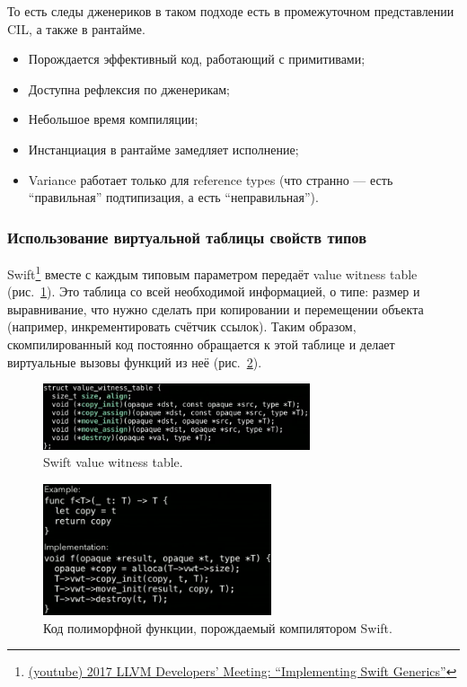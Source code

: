 То есть следы дженериков в таком подходе есть в промежуточном представлении CIL, а также в рантайме.

\begin{itemize}
    \item[\positive] Порождается эффективный код, работающий с примитивами;
    \item[\positive] Доступна рефлексия по дженерикам;
    \item[\positive] Небольшое время компиляции;
    \item[\negative] Инстанциация в рантайме замедляет исполнение;
    \item[\negative] Variance работает только для reference types (что странно --- есть ``правильная'' подтипизация, а есть ``неправильная'').
\end{itemize}


\subsubsection{Использование виртуальной таблицы свойств типов} \label{subsubsec:swift-generics}

Swift\footnote{\href{https://youtu.be/ctS8FzqcRug?si=y_ZYnuUOulA33d_X}{(youtube) 2017 LLVM Developers’ Meeting: ``Implementing Swift Generics''}} вместе с каждым типовым параметром передаёт value witness table (рис.~\ref{fig:swift-witness-table}).
Это таблица со всей необходимой информацией, о типе: размер и выравнивание, что нужно сделать при копировании и перемещении объекта (например, инкрементировать счётчик ссылок).
Таким образом, скомпилированный код постоянно обращается к этой таблице и делает виртуальные вызовы функций из неё (рис.~\ref{fig:swift-generated-code}).
\begin{figure}
    \centering
    \includegraphics[width=0.7\textwidth]{figs/swift-witness-table}
    \caption{Swift value witness table.}
    \label{fig:swift-witness-table}
\end{figure}
\begin{figure}
    \centering
    \includegraphics[width=0.6\textwidth]{figs/swift-generated-code}
    \caption{Код полиморфной функции, порождаемый компилятором Swift.}
    \label{fig:swift-generated-code}
\end{figure}

